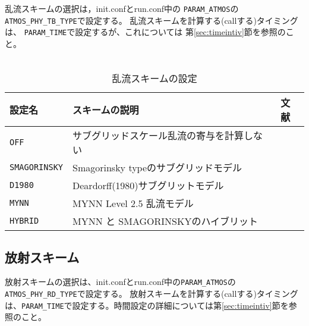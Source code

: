 乱流スキームの選択は，init.confとrun.conf中の
\verb|PARAM_ATMOS|の\verb|ATMOS_PHY_TB_TYPE|で設定する。
乱流スキームを計算する(callする)タイミングは、
\verb|PARAM_TIME|で設定するが、これについては
第\ref{sec:timeintiv}節を参照のこと。\\

\\

\begin{table}[h]
\begin{center}
  \caption{乱流スキームの設定}
  \label{tab:nml_atm_tb}
  \begin{tabularx}{150mm}{lXX} \hline
    \rowcolor[gray]{0.9}  設定名 & スキームの説明 & 文献\\ \hline
      \verb|OFF|          & サブグリッドスケール乱流の寄与を計算しない &  \\
      \verb|SMAGORINSKY|  & Smagorinsky typeのサブグリッドモデル    & \citet{smagorinsky_1963,lilly_1962,Brown_etal_1994,Scotti_1993} \\
      \verb|D1980|        & Deardorff(1980)サブグリットモデル &\citet{Deardorff_1980} \\
      \verb|MYNN|         & MYNN Level 2.5 乱流モデル & \citet{my_1982,nakanishi_2004} \\
      \verb|HYBRID|       & MYNN と SMAGORINSKYのハイブリット &  \\
    \hline
  \end{tabularx}
\end{center}
\end{table}




\subsection{放射スキーム} \label{sec:basic_radiation}
放射スキームの選択は、init.confとrun.conf中の\verb|PARAM_ATMOS|の\verb|ATMOS_PHY_RD_TYPE|で設定する。
放射スキームを計算する(callする)タイミングは、\verb|PARAM_TIME|で設定する。時間設定の詳細については第\ref{sec:timeintiv}節を参照のこと。\\

